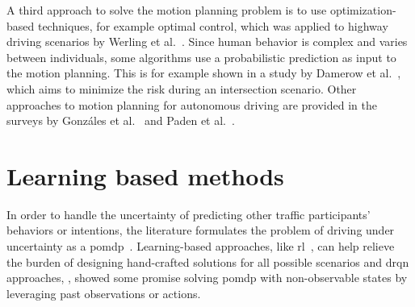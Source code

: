 A third approach to solve the motion planning problem is to use optimization-based techniques, for example optimal control, which was applied to highway driving scenarios by Werling et al.~\cite{Werling2010}. Since human behavior is complex and varies between individuals, some algorithms use a probabilistic prediction as input to the motion planning. This is for example shown in a study by Damerow et al.~\cite{Damerow2015}, which aims to minimize the risk during an intersection scenario. Other approaches to motion planning for autonomous driving are provided in the surveys by Gonzáles et al.~\cite{Gonzales2016} and Paden et al.~\cite{Paden2016}. 




\section{Learning based methods}
In order to handle the uncertainty of predicting other traffic participants' behaviors or intentions, the literature formulates the problem of driving under uncertainty as a \gls{pomdp}~\cite{Kochenderfer2015}. 
Learning-based approaches, like \gls{rl}~\cite{Sutton2018, Isele2018}, can help relieve the burden of designing hand-crafted solutions for all possible scenarios and \Gls{drqn} approaches, \cite{HausknechtS15drqn, zhu2018improving}, showed some promise solving \gls{pomdp} with non-observable states by leveraging past observations or actions. %

